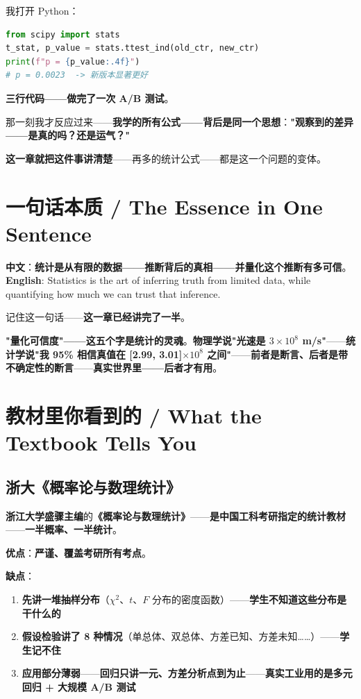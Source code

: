 我打开 Python：

\begin{lstlisting}[language=Python]
from scipy import stats
t_stat, p_value = stats.ttest_ind(old_ctr, new_ctr)
print(f"p = {p_value:.4f}")
# p = 0.0023  -> 新版本显著更好
\end{lstlisting}

\textbf{三行代码——做完了一次 A/B 测试}。

那一刻我才反应过来——\textbf{我学的所有公式——背后是同一个思想}：\textbf{"观察到的差异——是真的吗？还是运气？"}

\textbf{这一章就把这件事讲清楚}——再多的统计公式——都是这一个问题的变体。

\section{一句话本质 / The Essence in One Sentence}

\begin{tcolorbox}[essbox={一句话本质}]
\textbf{中文}：\textbf{统计是从有限的数据——推断背后的真相——并量化这个推断有多可信}。\\[6pt]
\textbf{English}: Statistics is the art of inferring truth from limited data, while quantifying how much we can trust that inference.
\end{tcolorbox}

记住这一句话——\textbf{这一章已经讲完了一半}。

\textbf{"量化可信度"——这五个字是统计的灵魂}。\textbf{物理学说"光速是 $3 \times 10^8$ m/s"}——\textbf{统计学说"我 95\% 相信真值在 [2.99, 3.01]$\times 10^8$ 之间"}——\textbf{前者是断言、后者是带不确定性的断言}——\textbf{真实世界里——后者才有用}。

\section{教材里你看到的 / What the Textbook Tells You}

\subsection{浙大《概率论与数理统计》}

\textbf{浙江大学盛骤主编}的\textbf{《概率论与数理统计》}——\textbf{是中国工科考研指定的统计教材}——\textbf{一半概率、一半统计}。

\textbf{优点}：\textbf{严谨、覆盖考研所有考点}。

\textbf{缺点}：

\begin{enumerate}
\item \textbf{先讲一堆抽样分布}（$\chi^2$、$t$、$F$ 分布的密度函数）——\textbf{学生不知道这些分布是干什么的}
\item \textbf{假设检验讲了 8 种情况}（单总体、双总体、方差已知、方差未知……）——\textbf{学生记不住}
\item \textbf{应用部分薄弱}——\textbf{回归只讲一元、方差分析点到为止}——\textbf{真实工业用的是多元回归 + 大规模 A/B 测试}
\end{enumerate}

